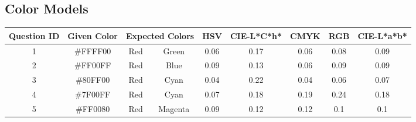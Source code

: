 \subsection{Color Models}
\label{subsec:results_colormodels}
%
\begin{table}[htbp]
  \resizebox{\textwidth}{!} {
  \begin{tabular}{@{}ccccccccc@{}}
    \toprule
    Question ID              & Given Color                                           & \multicolumn{2}{c}{Expected Colors}                         & HSV                                & CIE-L*C*h*                        & CMYK                               & RGB                                & CIE-L*a*b*                         \\ \midrule
    \multicolumn{1}{|c|}{1}  & \multicolumn{1}{c|}{\cellcolor[HTML]{FFFF00}\#FFFF00} & \multicolumn{1}{c|}{Red}     & \multicolumn{1}{c||}{Green}   & \multicolumn{1}{c|}{0.06}          & \multicolumn{1}{c|}{0.17}         & \multicolumn{1}{c|}{0.06}          & \multicolumn{1}{c|}{0.08}          & \multicolumn{1}{c|}{0.09}          \\ \midrule
    \multicolumn{1}{|c|}{2}  & \multicolumn{1}{c|}{\cellcolor[HTML]{FF00FF}\#FF00FF} & \multicolumn{1}{c|}{Red}     & \multicolumn{1}{c||}{Blue}    & \multicolumn{1}{c|}{0.09}          & \multicolumn{1}{c|}{0.13}         & \multicolumn{1}{c|}{0.06}          & \multicolumn{1}{c|}{0.09}          & \multicolumn{1}{c|}{0.09}          \\ \midrule
    \multicolumn{1}{|c|}{3}  & \multicolumn{1}{c|}{\cellcolor[HTML]{80FF00}\#80FF00} & \multicolumn{1}{c|}{Red}     & \multicolumn{1}{c||}{Cyan}    & \multicolumn{1}{c|}{0.04}          & \multicolumn{1}{c|}{0.22}         & \multicolumn{1}{c|}{0.04}          & \multicolumn{1}{c|}{0.06}          & \multicolumn{1}{c|}{0.07}          \\ \midrule
    \multicolumn{1}{|c|}{4}  & \multicolumn{1}{c|}{\cellcolor[HTML]{7F00FF}\#7F00FF} & \multicolumn{1}{c|}{Red}     & \multicolumn{1}{c||}{Cyan}    & \multicolumn{1}{c|}{0.07}          & \multicolumn{1}{c|}{0.18}         & \multicolumn{1}{c|}{0.19}          & \multicolumn{1}{c|}{0.24}          & \multicolumn{1}{c|}{0.18}          \\ \midrule
    \multicolumn{1}{|c|}{5}  & \multicolumn{1}{c|}{\cellcolor[HTML]{FF0080}\#FF0080} & \multicolumn{1}{c|}{Red}     & \multicolumn{1}{c||}{Magenta} & \multicolumn{1}{c|}{0.09}          & \multicolumn{1}{c|}{0.12}         & \multicolumn{1}{c|}{0.12}          & \multicolumn{1}{c|}{0.1}           & \multicolumn{1}{c|}{0.1}           \\ \midrule

\end{tabular}}
\end{table}
